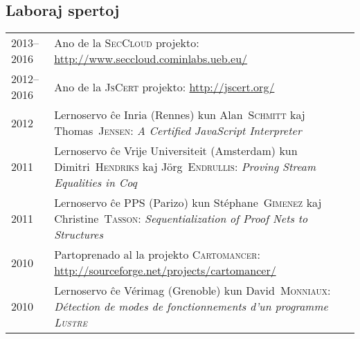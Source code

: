 \documentclass[12pt,a4paper]{article}
\makeatletter
\newcommand{\en}[1]{\foreignlanguage{english}{{#1}}}
\newcommand{\fr}[1]{\foreignlanguage{french}{{#1}}}
\newcommand{\en}[1]{\foreignlanguage{english}{{#1}}}
\newcommand{\fr}[1]{\foreignlanguage{french}{{#1}}}
\newenvironment{datecvsection}[1]%
               {\subsection*{#1}%
                 \noindent \begin{tabular}{@{}p{\annee}p{\texte}@{}}}
               {\end{tabular}}
\newcommand\familyName{\textsc}
\newcommand\placeName{}
\makeatother
\begin{document}
\begin{datecvsection}{Laboraj spertoj}

	2013–2016 & Ano de la \textsc{SecCloud} projekto:  \url{http://www.seccloud.cominlabs.ueb.eu/} \\

	2012–2016 & Ano de la \textsc{JsCert} projekto:  \url{http://jscert.org/} \\

    2012 & Lernoservo ĉe \placeName{Inria} (\placeName{Rennes}) kun Alan~\familyName{Schmitt} kaj Thomas~\familyName{Jensen}:
	\en{\textit{A Certified JavaScript Interpreter}} \\

    2011 & Lernoservo ĉe \placeName{Vrĳe Universiteit} (\placeName{Amsterdam}) kun Dimitri~\familyName{Hendriks} kaj Jörg~\familyName{Endrullis}:
	\en{\textit{Proving Stream Equalities in Coq}} \\

    2011 & Lernoservo ĉe \placeName{PPS} (\placeName{Parizo}) kun Stéphane~\familyName{Gimenez} kaj Christine~\familyName{Tasson}:
	\en{\textit{Sequentialization of Proof Nets to Structures}} \\

	2010 & Partoprenado al la projekto \textsc{Cartomancer}:  \url{http://sourceforge.net/projects/cartomancer/} \\

    2010 & Lernoservo ĉe \placeName{Vérimag} (\placeName{Grenoble}) kun David~\familyName{Monniaux}:
    \fr{\textit{Détection de modes de fonctionnements d’un programme \textsc{Lustre}}} \\

\end{datecvsection}
\end{document}
